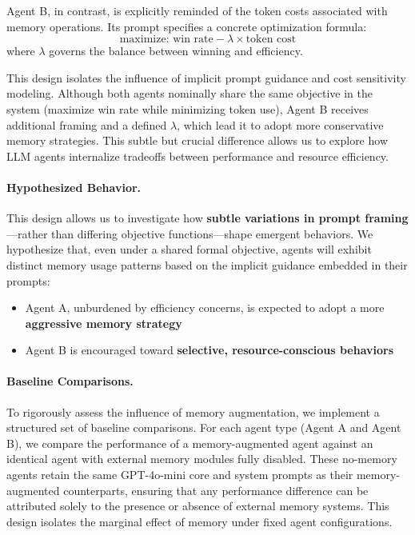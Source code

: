 \documentclass[10pt]{article}
\begin{document}
Agent B, in contrast, is explicitly reminded of the token costs associated with memory operations. Its prompt specifies a concrete optimization formula:
$$
\text{maximize: win rate} - \lambda \times \text{token cost}
$$
where $\lambda$ governs the balance between winning and efficiency.

This design isolates the influence of implicit prompt guidance and cost sensitivity modeling. Although both agents nominally share the same objective in the system (maximize win rate while minimizing token use), Agent B receives additional framing and a defined $\lambda$, which lead it to adopt more conservative memory strategies. This subtle but crucial difference allows us to explore how LLM agents internalize tradeoffs between performance and resource efficiency.

\paragraph{Hypothesized Behavior.} This design allows us to investigate how \textbf{subtle variations in prompt framing}---rather than differing objective functions---shape emergent behaviors. We hypothesize that, even under a shared formal objective, agents will exhibit distinct memory usage patterns based on the implicit guidance embedded in their prompts:
\begin{itemize}[leftmargin=*,nosep]
    \item Agent A, unburdened by efficiency concerns, is expected to adopt a more \textbf{aggressive memory strategy}
    \item Agent B is encouraged toward \textbf{selective, resource-conscious behaviors}
\end{itemize}

\paragraph{Baseline Comparisons.}
To rigorously assess the influence of memory augmentation, we implement a structured set of baseline comparisons. For each agent type (Agent A and Agent B), we compare the performance of a memory-augmented agent against an identical agent with external memory modules fully disabled. These no-memory agents retain the same GPT-4o-mini core and system prompts as their memory-augmented counterparts, ensuring that any performance difference can be attributed solely to the presence or absence of external memory systems. This design isolates the marginal effect of memory under fixed agent configurations.
\end{document}
